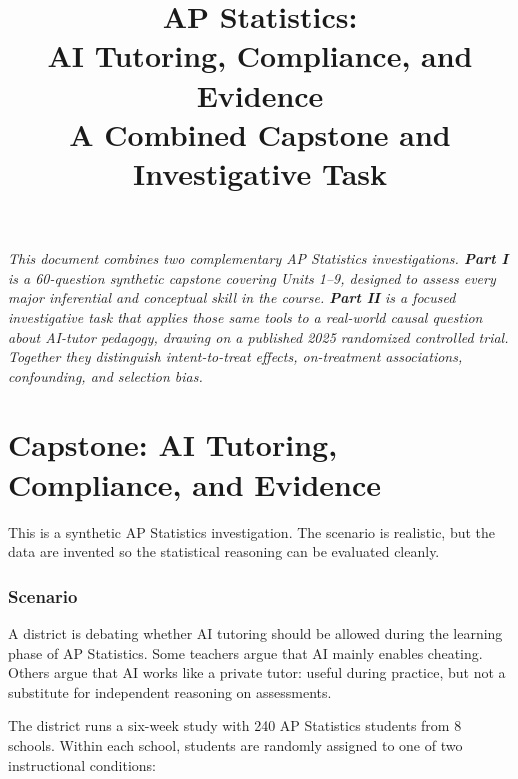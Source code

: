 \documentclass[11pt]{article}
\title{\bfseries AP Statistics:\\ AI Tutoring, Compliance, and Evidence \\[0.4em]
\large A Combined Capstone and Investigative Task}
\author{}
\date{}
\begin{document}
\maketitle
\thispagestyle{empty}

\begin{center}
\begin{minipage}{0.85\textwidth}
\itshape
This document combines two complementary AP Statistics investigations.
\textbf{Part I} is a 60-question synthetic capstone covering Units 1--9,
designed to assess every major inferential and conceptual skill in the
course. \textbf{Part II} is a focused investigative task that applies
those same tools to a real-world causal question about AI-tutor
pedagogy, drawing on a published 2025 randomized controlled trial.
Together they distinguish \emph{intent-to-treat effects},
\emph{on-treatment associations}, \emph{confounding}, and
\emph{selection bias}.
\end{minipage}
\end{center}

\vspace{1em}
\tableofcontents
\newpage

\part{Capstone: AI Tutoring, Compliance, and Evidence}

\begin{notebox}
This is a synthetic AP Statistics investigation. The scenario is
realistic, but the data are invented so the statistical reasoning can
be evaluated cleanly.
\end{notebox}

\section{Scenario}

A district is debating whether AI tutoring should be allowed during the
learning phase of AP Statistics. Some teachers argue that AI mainly
enables cheating. Others argue that AI works like a private tutor:
useful during practice, but not a substitute for independent reasoning
on assessments.

The district runs a six-week study with 240 AP Statistics students
from 8 schools. Within each school, students are randomly assigned to
one of two instructional conditions:
\end{document}
